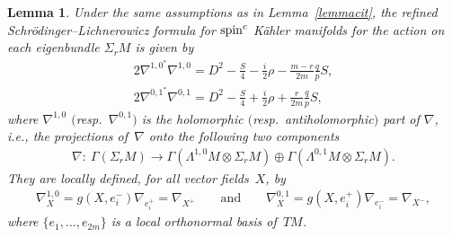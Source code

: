 \documentclass[pdftex]{sigma}
\numberwithin{equation}{section}
\newtheorem{lem}[thm]{Lemma}
\theoremstyle{definition}
\begin{document}
\begin{lem}\label{refinedd} Under  the same assumptions as in Lemma~{\rm \ref{lemmacit}}, the  refined  Schr\"odinger--Lichne\-ro\-wicz formula for ${\mathop{\rm spin}^c}$ K\"ahler manifolds  for the action on each eigenbundle $\Sigma_{r}M$ is given by
\begin{gather}\label{sl1}
 2\nabla^{{1,0}^*}\nabla^{1,0}=D^2-\frac{S}{4}-\frac{i}{2}\rho-\frac{m-r}{2m}\frac{q}{p}S,
\\
\label{sl2}
 2\nabla^{{0,1}^*}\nabla^{0,1}=D^2-\frac{S}{4}+\frac{i}{2}\rho+\frac{r}{2m}\frac{q}{p}S,
\end{gather}
where $\nabla^{1, 0}$  $($resp.\ $\nabla^{0,1})$  is the holomorphic $($resp.\ antiholomorphic$)$  part of $\nabla$, i.e., the projections of~$\nabla$ onto the following two components
\begin{gather*}
\nabla\colon \ \Gamma(\Sigma_{r}M)\to \Gamma(\Lambda^{1,0}M\otimes\Sigma_{r}M)\oplus \Gamma(\Lambda^{0,1}M\otimes\Sigma_{r}M).
\end{gather*} They are locally defined, for all vector fields~$X$,  by
\begin{gather*}
\nabla^{1, 0}_X  = g(X, e_i^-) \nabla_{e_i^+}=\nabla_{X^+} \qquad \text{and}\qquad \nabla^{0, 1}_X = g(X, e_i^+) \nabla_{e_i^-}=\nabla_{X^-},
\end{gather*}
where $\{e_1,\dots, e_{2m}\}$ is a local orthonormal basis of~$TM$.
\end{lem}
\end{document}
